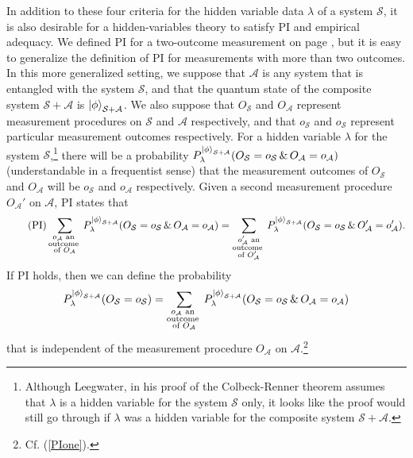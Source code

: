 In addition to these four criteria for the hidden variable data $\lambda$ of a system $\mathcal{S}$, it is also desirable for a hidden-variables theory to satisfy PI and empirical adequacy. We defined PI for a two-outcome measurement on page \pageref{PIdef}, but it is easy to generalize the definition of PI for measurements with more than two outcomes. In this more generalized setting, we suppose that $\mathcal{A}$ is any system that is entangled with the system $\mathcal{S}$, and that the quantum state of the composite system $\mathcal{S}+\mathcal{A}$  is $\ket{\phi}_{\mathcal{S}+\mathcal{A}}$. We also suppose that $O_{\mathcal{S}}$ and $O_{\mathcal{A}}$ represent measurement procedures on $\mathcal{S}$ and $\mathcal{A}$ respectively, and that $o_{\mathcal{S}}$ and $o_{\mathcal{S}}$ represent particular measurement outcomes respectively. For a hidden variable $\lambda$ for the system $\mathcal{S}$,\footnote{Although Leegwater, in his proof of the Colbeck-Renner theorem assumes that $\lambda$ is a hidden variable for the system $\mathcal{S}$ only, it looks like the proof would still go through if $\lambda$ was a hidden variable for the composite system $\mathcal{S}+\mathcal{A}$.} there will be a probability $P_\lambda^{\ket{\phi}_{\mathcal{S}+\mathcal{A}}}(O_\mathcal{S}=o_\mathcal{S}\, \& \, O_\mathcal{A}=o_\mathcal{A})$ (understandable in a frequentist sense) that the measurement outcomes of $O_{\mathcal{S}}$ and $O_{\mathcal{A}}$ will be $o_{\mathcal{S}}$  and $o_{\mathcal{A}}$ respectively. Given a second measurement procedure $O_{\mathcal{A}}'$ on $\mathcal{A}$, PI states that
\begin{equation}\tag{PI}
	\sum_{\substack{o_\mathcal{A}\text{ an }\\ \text{outcome }\\ 
	 \text{of }O_{\mathcal{A}}}}P_\lambda^{\ket{\phi}_{\mathcal{S}+\mathcal{A}}}(O_\mathcal{S}=o_\mathcal{S}\, \& \,O_\mathcal{A}=o_\mathcal{A}) = \sum_{\substack{o_\mathcal{A}'\text{ an}\\ \text{outcome }\\ 
	 \text{of }O_{\mathcal{A}}'}}P_\lambda^{\ket{\phi}_{\mathcal{S}+\mathcal{A}}}(O_\mathcal{S}=o_\mathcal{S}\, \& \,O'_\mathcal{A}=o'_\mathcal{A}). 
\end{equation}
If PI holds, then we can define the probability
\begin{equation}
	P^{\ket{\phi}_{\mathcal{S}+\mathcal{A}}}_{\lambda}(O_\mathcal{S}=o_\mathcal{S})=\sum_{\substack{o_\mathcal{A}\text{ an }\\ \text{outcome }\\ 
	\text{of }O_{\mathcal{A}}}}P_\lambda^{\ket{\phi}_{\mathcal{S}+\mathcal{A}}}(O_\mathcal{S}=o_\mathcal{S}\, \& \,O_\mathcal{A}=o_\mathcal{A})
\end{equation}
that is independent of the measurement procedure $O_\mathcal{A}$ on $\mathcal{A}$.\footnote{Cf. (\ref{PIone}).}



